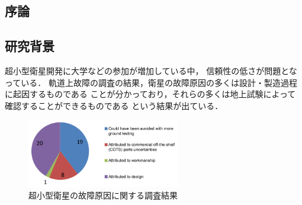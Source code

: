 \documentclass[11pt]{jsarticle}%
\begin{document}
\begin{multicols}{2}
  \section{序論}
  \vspace{-1zh}
  \subsection{研究背景}
  \vspace{-1zh}
  超小型衛星開発に大学などの参加が増加している中，
  信頼性の低さが問題となっている\cite{Langer2016}．
  軌道上故障の調査の結果，衛星の故障原因の多くは設計・製造過程に起因するものである\cite{Venturini2017}
  ことが分かっており，それらの多くは地上試験によって確認することができるものである
  という結果が出ている\cite{SAITO2011}．
 

  \begin{figure}[H]
    \centering
      \includegraphics[height=3.0cm]{../figure/cause_of_failure.png}
      \caption{超小型衛星の故障原因に関する調査結果\cite{Venturini2017}}
      \label{fig:cause_of_failure}
  \end{figure}
  

\end{multicols}
\end{document}
